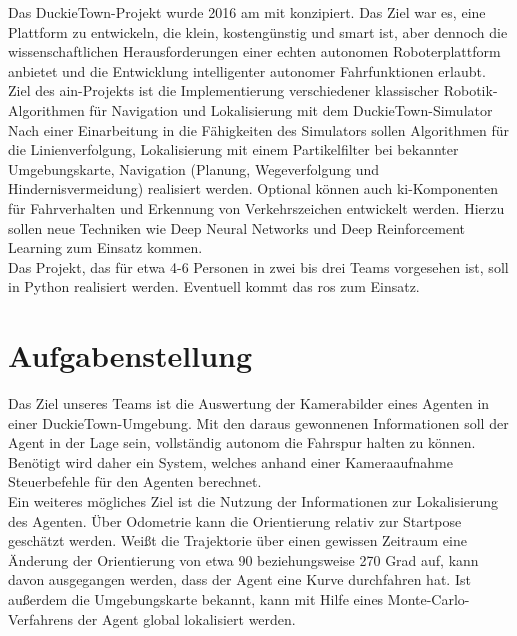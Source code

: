 Das DuckieTown-Projekt wurde 2016 am \acf{mit} konzipiert. Das Ziel war es, eine Plattform zu
entwickeln, die klein, kostengünstig und \grqq smart\grqq{} ist, aber dennoch die wissenschaftlichen
Herausforderungen einer echten autonomen Roboterplattform anbietet und die Entwicklung
intelligenter autonomer Fahrfunktionen erlaubt. \cite{duckietown}\\

\noindent Ziel des \acs{ain}-Projekts ist die Implementierung verschiedener klassischer Robotik-Algorithmen
für Navigation und Lokalisierung mit dem DuckieTown-Simulator\\

\noindent Nach einer Einarbeitung in die Fähigkeiten des Simulators sollen Algorithmen für die
Linienverfolgung, Lokalisierung mit einem Partikelfilter bei bekannter Umgebungskarte,
Navigation (Planung, Wegeverfolgung und Hindernisvermeidung) realisiert werden. Optional können auch \acs{ki}-Komponenten für
Fahrverhalten und Erkennung von Verkehrszeichen entwickelt werden. Hierzu sollen neue
Techniken wie Deep Neural Networks und Deep Reinforcement Learning zum Einsatz
kommen.\\

\noindent Das Projekt, das für etwa 4-6 Personen in zwei bis drei Teams vorgesehen ist, soll in Python realisiert werden.
Eventuell kommt das \acf{ros} zum Einsatz.

\newpage

\section{Aufgabenstellung}

Das Ziel unseres Teams ist die Auswertung der Kamerabilder eines Agenten in einer DuckieTown-Umgebung. Mit den daraus gewonnenen Informationen soll der Agent in der Lage sein, vollständig autonom die Fahrspur halten zu können. Benötigt wird daher ein System, welches anhand einer Kameraaufnahme Steuerbefehle für den Agenten berechnet. \\

Ein weiteres mögliches Ziel ist die Nutzung der Informationen zur Lokalisierung des Agenten. Über Odometrie kann die Orientierung relativ zur Startpose geschätzt werden. Weißt die Trajektorie über einen gewissen Zeitraum eine Änderung der Orientierung von etwa 90 beziehungsweise 270 Grad auf, kann davon ausgegangen werden, dass der Agent eine Kurve durchfahren hat. Ist außerdem die Umgebungskarte bekannt, kann mit Hilfe eines Monte-Carlo-Verfahrens der Agent global lokalisiert werden.\\

